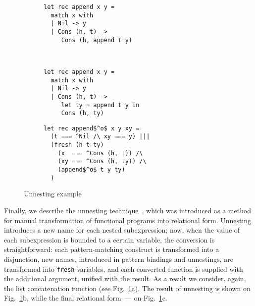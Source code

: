\begin{figure}[t]
  \centering
  \begin{subfigure}[t]{0.4\textwidth}
    \centering
\begin{lstlisting}
let rec append x y =
  match x with
  | Nil -> y
  | Cons (h, t) ->
     Cons (h, append t y)     
\end{lstlisting}
\caption{}
  \end{subfigure}
  ~
  \begin{subfigure}[t]{0.4\textwidth}
        \centering
\begin{lstlisting}
let rec append x y =
  match x with 
  | Nil -> y
  | Cons (h, t) -> 
     let ty = append t y in
     Cons (h, ty)
\end{lstlisting}
\vspace{-1\baselineskip}
\caption{}
  \end{subfigure}
  \vskip2mm
  \begin{subfigure}[t]{0.4\textwidth}
        \centering
\begin{lstlisting}
let rec append$^o$ x y xy =
  (t === ^Nil /\ xy === y) |||
  (fresh (h t ty)
    (x  === ^Cons (h, t)) /\
    (xy === ^Cons (h, ty)) /\
    (append$^o$ t y ty)
  )
\end{lstlisting}
\vspace{-1\baselineskip}
\caption{}
  \end{subfigure}
  \vskip3mm
\caption{Unnesting example}
\label{unnesting_example}
\end{figure}

Finally, we describe the unnesting technique~\cite{TRS}, which was introduced as a method for manual transformation
of functional programs into relational form. Unnesting introduces a new name for each nested subexpression; now, when the value of
each subexpression is bounded to a certain variable, the conversion is straightforward: each pattern-matching construct is
transformed into a disjunction, new names, introduced in pattern bindings and unnestings, are transformed into \lstinline|fresh| variables, and
each converted function is supplied with the additional argument, unified with the result. As a result we consider, again, the list
concatenation function (see Fig.~\ref{unnesting_example}a). The result of unnesting is shown on Fig.~\ref{unnesting_example}b, while the
final relational form~--- on Fig.~\ref{unnesting_example}c.

